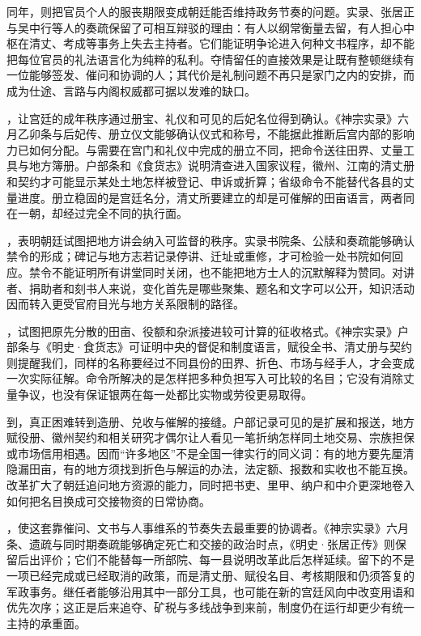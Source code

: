 同年，则把官员个人的服丧期限变成朝廷能否维持政务节奏的问题。实录、张居正与吴中行等人的奏疏保留了可相互辩驳的理由：有人以纲常衡量去留，有人担心中枢在清丈、考成等事务上失去主持者。它们能证明争论进入何种文书程序，却不能把每位官员的礼法语言化为纯粹的私利。夺情留任的直接效果是让既有整顿继续有一位能够签发、催问和协调的人；其代价是礼制问题不再只是家门之内的安排，而成为仕途、言路与内阁权威都可据以发难的缺口。

，让宫廷的成年秩序通过册宝、礼仪和可见的后妃名位得到确认。《神宗实录》六月乙卯条与后妃传、册立仪文能够确认仪式和称号，不能据此推断后宫内部的影响力已如何分配。与需要在宫门和礼仪中完成的册立不同，把命令送往田界、丈量工具与地方簿册。户部条和《食货志》说明清查进入国家议程，徽州、江南的清丈册和契约才可能显示某处土地怎样被登记、申诉或折算；省级命令不能替代各县的丈量进度。册立稳固的是宫廷名分，清丈所要建立的却是可催解的田亩语言，两者同在一朝，却经过完全不同的执行面。

，表明朝廷试图把地方讲会纳入可监督的秩序。实录书院条、公牍和奏疏能够确认禁令的形成；碑记与地方志若记录停讲、迁址或重修，才可检验一处书院如何回应。禁令不能证明所有讲堂同时关闭，也不能把地方士人的沉默解释为赞同。对讲者、捐助者和刻书人来说，变化首先是哪些聚集、题名和文字可以公开，知识活动因而转入更受官府目光与地方关系限制的路径。

，试图把原先分散的田亩、役额和杂派接进较可计算的征收格式。《神宗实录》户部条与《明史·食货志》可证明中央的督促和制度语言，赋役全书、清丈册与契约则提醒我们，同样的名称要经过不同县份的田界、折色、市场与经手人，才会变成一次实际征解。命令所解决的是怎样把多种负担写入可比较的名目；它没有消除丈量争议，也没有保证银两在每一处都比实物或劳役更易取得。

到，真正困难转到造册、兑收与催解的接缝。户部记录可见的是扩展和报送，地方赋役册、徽州契约和相关研究才偶尔让人看见一笔折纳怎样同土地交易、宗族担保或市场信用相遇。因而“许多地区”不是全国一律实行的同义词：有的地方要先厘清隐漏田亩，有的地方须找到折色与解运的办法，法定额、报数和实收也不能互换。改革扩大了朝廷追问地方资源的能力，同时把书吏、里甲、纳户和中介更深地卷入如何把名目换成可交接物资的日常协商。

，使这套靠催问、文书与人事维系的节奏失去最重要的协调者。《神宗实录》六月条、遗疏与同时期奏疏能够确定死亡和交接的政治时点，《明史·张居正传》则保留后出评价；它们不能替每一所部院、每一县说明改革此后怎样延续。留下的不是一项已经完成或已经取消的政策，而是清丈册、赋役名目、考核期限和仍须答复的军政事务。继任者能够沿用其中一部分工具，也可能在新的宫廷风向中改变用语和优先次序；这正是后来追夺、矿税与多线战争到来前，制度仍在运行却更少有统一主持的承重面。

